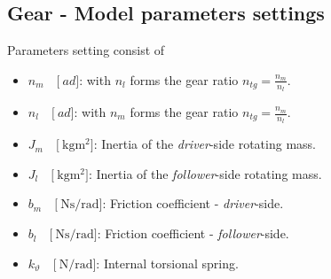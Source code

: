 \documentclass[12pt,a4paper]{scrartcl}
\begin{document}
\begin{onehalfspace}
\section{Gear - Model parameters settings}
Parameters setting consist of
\begin{itemize}
	\item[--] $n_m\quad\Big[\SI{}{ad}\Big]$: with $n_l$ forms the gear ratio $n_{tg} = \frac{n_m}{n_l}$.
	\item[--] $n_l\quad\Big[\SI{}{ad}\Big]$: with $n_m$ forms the gear ratio $n_{tg} = \frac{n_m}{n_l}$.
	\item[--] $J_m\quad\Big[\SI{}{\kilo\gram\square\meter}\Big]$: Inertia of the \textit{driver}-side rotating mass.
	\item[--] $J_l\quad\Big[\SI{}{\kilo\gram\square\meter}\Big]$: Inertia of the \textit{follower}-side rotating mass.
	\item[--] $b_m\quad\Big[\SI{}{\newton\second\per\radian}\Big]$: Friction coefficient - \textit{driver}-side.
	\item[--] $b_l\quad\Big[\SI{}{\newton\second\per\radian}\Big]$: Friction coefficient - \textit{follower}-side.
	\item[--] $k_\vartheta\quad\Big[\SI{}{\newton\per\radian}\Big]$: Internal torsional spring.	
\end{itemize}
\end{onehalfspace}
\end{document}
